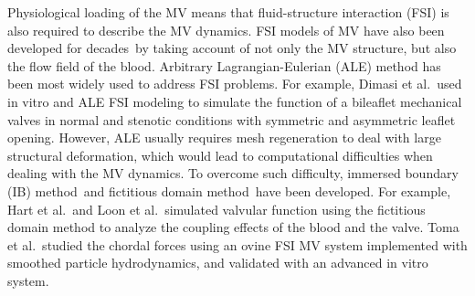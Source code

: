 \documentclass[fleqn,10pt]{wlscirep}
\begin{document}
Physiological loading of the MV means that fluid-structure interaction (FSI) is also required to describe the MV dynamics. FSI models of MV have also been  developed for decades\,\cite{Watton2008Effect,Kunzelman2007Fluid,Hao2014A,Gao2017A,Xingshuang2013Image,Chung2014An} by taking account of not only the MV structure, but also the flow field of the blood. Arbitrary Lagrangian-Eulerian (ALE) method has been most widely used to address FSI problems. For example, Dimasi et al.\,\cite{RN2} used in vitro and  ALE FSI modeling to simulate the function of a bileaflet mechanical valves  in normal and stenotic conditions with symmetric and asymmetric leaflet opening. However, ALE usually requires mesh regeneration to deal with large structural deformation, which would lead to  computational difficulties when dealing with the MV dynamics. To overcome such difficulty, immersed boundary (IB) method\,\cite{peskin_2002} and  fictitious domain method\,\cite{sotiropoulos2009review} have been developed. For example, Hart et al.\,\cite{Hart2003A} and  Loon et al.\,\cite{Loon2006A} simulated  valvular function using the fictitious domain method to analyze the coupling effects of the blood and the  valve. Toma et al.\,\cite{Toma2016Fluid}  studied the chordal forces using an ovine FSI  MV system implemented with smoothed particle hydrodynamics, and validated with an advanced in vitro system.
\end{document}
